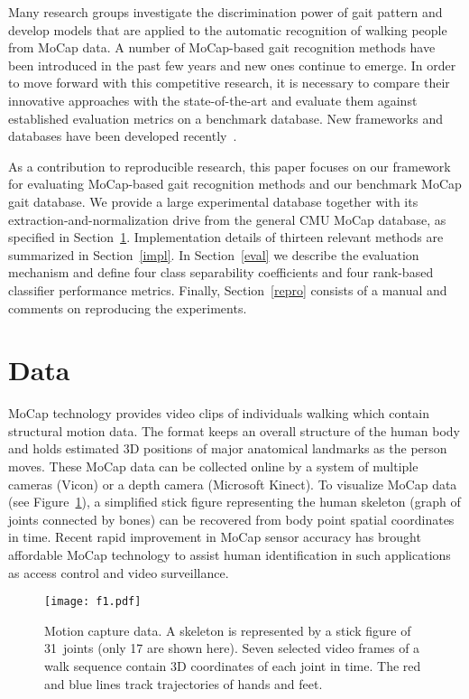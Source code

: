 \documentclass[10pt,a4paper]{llncs}
\begin{document}
Many research groups investigate the discrimination power of gait pattern and develop models that are applied to the automatic recognition of walking people from MoCap data. A number of MoCap-based gait recognition methods have been introduced in the past few years and new ones continue to emerge. In order to move forward with this competitive research, it is necessary to compare their innovative approaches with the state-of-the-art and evaluate them against established evaluation metrics on a benchmark database. New frameworks and databases have been developed recently~\cite{CK13,KTTEF15}.

As a contribution to reproducible research, this paper focuses on our framework for evaluating MoCap-based gait recognition methods and our benchmark MoCap gait database. We provide a large experimental database together with its extraction-and-normalization drive from the general CMU MoCap database, as specified in Section~\ref{db}. Implementation details of thirteen relevant methods are summarized in Section~\ref{impl}. In Section~\ref{eval} we describe the evaluation mechanism and define four class separability coefficients and four rank-based classifier performance metrics. Finally, Section~\ref{repro} consists of a manual and comments on reproducing the experiments.

\section{Data}
\label{db}

MoCap technology provides video clips of individuals walking which contain structural motion data. The format keeps an overall structure of the human body and holds estimated 3D positions of major anatomical landmarks as the person moves. These MoCap data can be collected online by a system of multiple cameras (Vicon) or a depth camera (Microsoft Kinect). To visualize MoCap data (see Figure~\ref{f1}), a simplified stick figure representing the human skeleton (graph of joints connected by bones) can be recovered from body point spatial coordinates in time. Recent rapid improvement in MoCap sensor accuracy has brought affordable MoCap technology to assist human identification in such applications as access control and video surveillance.

\begin{figure}[ht]
\vspace{-8pt}
\centering
\texttt{[image: f1.pdf]}
\vspace{-5pt}
\caption{Motion capture data. A skeleton is represented by a stick figure of 31~joints (only 17 are shown here). Seven selected video frames of a walk sequence contain 3D coordinates of each joint in time. The red and blue lines track trajectories of hands and feet.~\cite{VBZ16}}
\label{f1}
\vspace{-5pt}
\end{figure}
\end{document}
